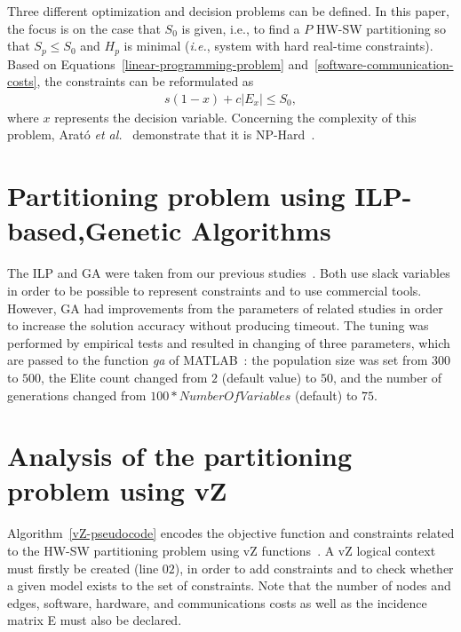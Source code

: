 Three different optimization and decision problems can be defined. In this paper, the focus is on the case that $ S_0 $ is given, i.e., to find a $P$ HW-SW partitioning so that $ S_p \leq S_0 $ and $ H_p $ is minimal ({\it i.e.}, system with hard real-time constraints). Based on Equations~\ref{linear-programming-problem} and~\ref{software-communication-costs}, the constraints can be reformulated as 
%
\begin{align}
\label{hw-sw-partitioning}
s\left(1-x\right) + c|E_x| \leq S_0, 
\end{align}
%
\noindent where $x$ represents the decision variable. Concerning the complexity of this problem, Arat\'o {\it et al.}~\cite{Arato2003} demonstrate that it is NP-Hard~\cite{Cormem}.

\section{Partitioning problem using ILP-based,Genetic Algorithms}
\label{ILPGA}

The ILP and GA were taken from our previous studies~\cite{Trindade2015,Trindade2014}. Both use slack variables in order to be possible to represent constraints and to use commercial tools. However, GA had improvements from the parameters of related studies in order to increase the solution accuracy without producing timeout. The tuning was performed by empirical tests and resulted in changing of three parameters, which are passed to the function \textit{ga} of MATLAB~\cite{TheMathWorks2013}: the population size was set from $300$ to $500$, the Elite count changed from $2$ (default value) to $50$, and the number of generations changed from $100*NumberOfVariables$ (default) to $75$.

\section{Analysis of the partitioning problem using vZ}
\label{Analysis-of-the-partitioning-problem-using-vZ}

Algorithm~\ref{vZ-pseudocode} encodes the objective function and constraints related to the HW-SW partitioning problem using vZ functions~\cite{Bjorner2014}. A vZ logical context must firstly be created (line $02$), in order to add constraints and to check whether a given model exists to the set of constraints. Note that the number of nodes and edges, software, hardware, and communications costs as well as the incidence matrix E must also be declared.

